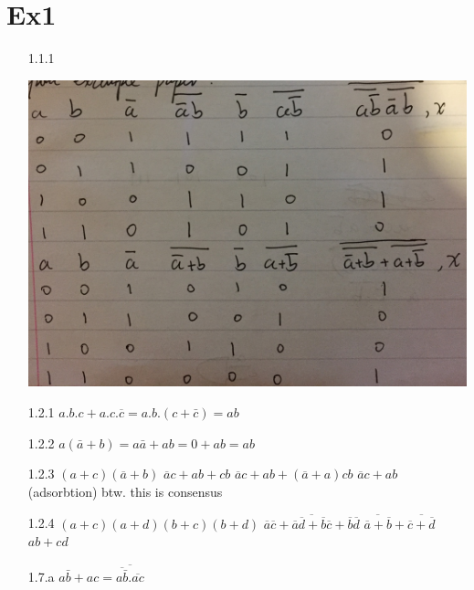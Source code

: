 \documentclass[10pt,twoside,a4paper]{article}
\begin{document}
\section{Ex1}
\begin{enumerate}
\item[1.1.1]

\includegraphics[scale=0.1]{1-1.JPG}

\item[1.2.1] $a.b.c+a.c.\overline{c}=a.b.(c+\bar{c})=ab$ \newline
\item[1.2.2] $a(\bar{a}+b)=a\bar{a}+ab=0+ab=ab$ \newline
\item[1.2.3] $(a+c)(\overline{a}+b)$ \newline
	  $\overline{a}c+ab+cb$	\newline
	  $\overline{a}c+ab+(\overline{a}+a)cb$\newline 
	  $\overline{a}c+ab$ (adsorbtion) btw. this is consensus \newline
\item[1.2.4] $(a+c)(a+d)(b+c)(b+d)$ \newline
	  $\overline{\overline{a}\overline{c}+\overline{a}\overline{d}+\overline{b}\overline{c}+\overline{b}\overline{d}}$ \newline
	  $\overline{\overline{a}+\overline{b}}+\overline{\overline{c}+\overline{d}}$\newline
	  $ab+cd$
\item[1.7.a]
$a\bar{b}+ac=\overline{\overline{a\bar{b}}.\overline{ac}}$


\end{enumerate}
\end{document}

